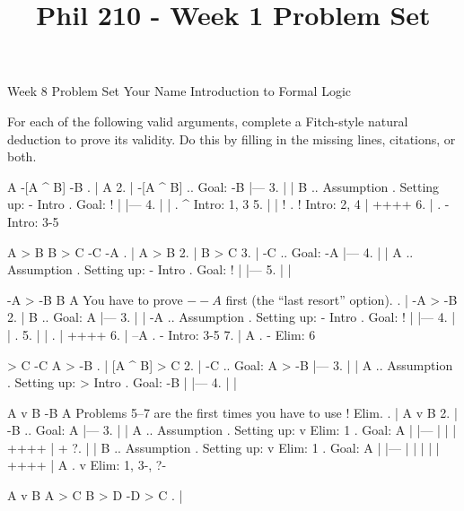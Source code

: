 
\title{Phil 210 - Week 1 Problem Set}

\heading
Week 8 Problem Set
Your Name
Introduction to Formal Logic
\endheading

For each of the following valid arguments, complete a Fitch-style natural deduction to prove its validity. Do this by filling in the missing lines, citations, or both.

\problems
{}
\argument
 A
 -[A ^ B]
\argumentline
 -B
\endargument
	\answer
	. | A
	 2. | -[A ^ B]  ..  Goal: -B
	    |---
	 3. |  | B      ..  Assumption  .  Setting up: - Intro  .  Goal: !
	    |  |---
	 4. |  |        .  ^ Intro: 1, 3
	 5. |  | !      .  ! Intro: 2, 4
	    |  ++++
	 6. |           .  - Intro: 3-5
	\endfitchproof
	\endanswer

\argument
 A > B
 B > C
 -C
\argumentline
 -A
\endargument
	\answer
	. | A > B
	 2. | B > C
	 3. | -C     ..  Goal: -A
	    |---
	 4. |  | A   ..  Assumption  .  Setting up: - Intro  .  Goal: !
	    |  |---
	 5. |  | 
	\endfitchproof
	\endanswer

\argument
 -A > -B
 B
\argumentline
 A
\endargument
\Hint You have to prove $--A$ first (the ``last resort'' option).
	\answer
	. | -A > -B
	 2. | B        ..  Goal: A
	    |---
	 3. |  | -A    ..  Assumption  .  Setting up: - Intro  .  Goal: !
	    |  |---
	 4. |  |       .  
	 5. |  |       .  
	    |  ++++
	 6. | --A      .  - Intro: 3-5
	 7. | A        .  - Elim: 6
	\endfitchproof
	\endanswer

\argument
 [A ^ B] > C
 -C
\argumentline
 A > -B
\endargument
	\answer
	. | [A ^ B] > C
	 2. | -C           .. Goal: A > -B
	    |---
	 3. |  | A         ..  Assumption  .  Setting up: > Intro  .  Goal: -B
	    |  |---
	 4. |  | 
	\endfitchproof
	\endanswer

\widerfitchsetup
{}
\argument
 A v B
 -B
\argumentline
 A
\endargument
\Hint Problems 5--7 are the first times you have to use $!$ Elim.
	\answer
	. | A v B
	 2. | -B     ..  Goal: A
	    |---
	 3. |  | A   ..  Assumption  .  Setting up: v Elim: 1  .  Goal: A
	    |  |---
	    |  | 
	    |  ++++
	    |  +
	 ?. |  | B   ..  Assumption  .  Setting up: v Elim: 1  .  Goal: A
	    |  |---
	    |  | 
	    |  | 
	    |  ++++
	    | A      .  v Elim: 1, 3-, ?-
	\endfitchproof
	\endanswer

\argument
 A v B
 A > C
 B > D
\argumentline
 -D > C
\endargument
	\answer
	. | 
	\endfitchproof
	\endanswer

